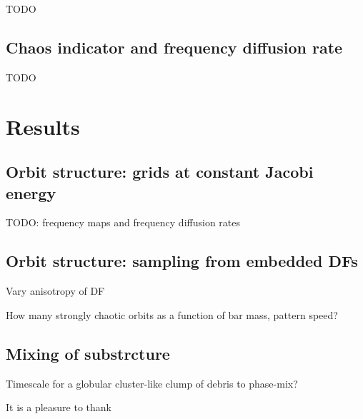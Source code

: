 \documentclass[modern]{aastex61}
\begin{document}
TODO

\subsection{Chaos indicator and frequency diffusion rate} \label{sec:freqdiff}

TODO

\section{Results} \label{sec:results}

\subsection{Orbit structure: grids at constant Jacobi energy}

TODO: frequency maps and frequency diffusion rates

\subsection{Orbit structure: sampling from embedded DFs}

Vary anisotropy of DF

How many strongly chaotic orbits as a function of bar mass, pattern speed?

\subsection{Mixing of substrcture}

Timescale for a globular cluster-like clump of debris to phase-mix?

\acknowledgements

It is a pleasure to thank





\clearpage


\end{document}
